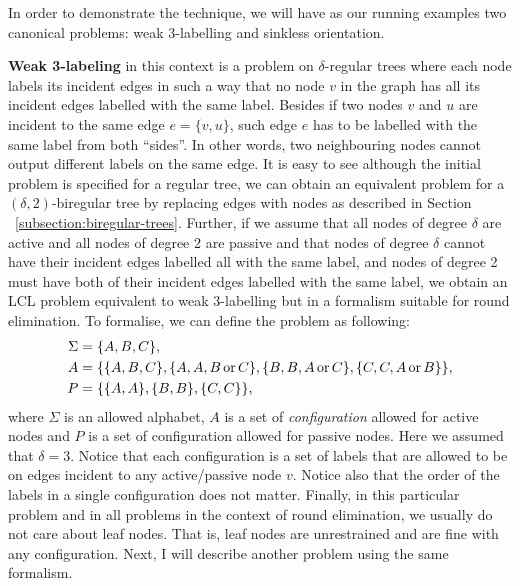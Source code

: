 In order to demonstrate the technique, we will have as our running
examples two canonical problems: weak 3-labelling and sinkless orientation.

\textbf{Weak 3-labeling} in this context is a problem on $\delta$-regular trees where
each node labels its incident edges in such a way that no node $v$ in the graph
has all its incident edges labelled with the same label. Besides if two
nodes $v$ and $u$ are incident to the same edge $e = \{v, u\}$, such
edge $e$ has to be labelled with the same label from both ``sides''. In other words,
two neighbouring nodes cannot output different labels on the same edge.
It is easy to see although the initial problem is specified for a regular
tree, we can obtain an equivalent problem for a $(\delta, 2)$-biregular tree
by replacing edges with nodes as described in Section ~\ref{subsection:biregular-trees}.
Further, if we assume that all nodes of degree $\delta$ are active and all nodes of 
degree 2 are passive and that nodes of degree $\delta$ cannot have their incident
edges labelled all with the same label, and nodes of degree 2 must have both of their
incident edges labelled with the same label, we obtain an LCL problem equivalent to
weak 3-labelling but in a formalism suitable for round elimination. To formalise, we
can define the problem as following:
\begin{align*}
\Sigma &= \{A, B, C\}, \\
A &= \{ \{A, B, C\}, \{A, A, B \operatorname{or} C\}, \{B, B, A \operatorname{or} C\}, \{C, C, A \operatorname{or} B\} \}, \\
P &= \{ \{A, A\}, \{B, B\}, \{C, C\}\},
\end{align*}
where $\Sigma$ is an allowed alphabet, $A$ is a set of \emph{configuration}
allowed for active nodes and $P$ is a set of configuration allowed for
passive nodes. Here we assumed that $\delta = 3$. Notice that each
configuration is a set of labels that are allowed to be on edges 
incident to any active/passive node $v$. Notice also that the order of
the labels in a single configuration does not matter. Finally, in this particular problem
and in all problems in the context of round elimination, we usually do not care about
leaf nodes. That is, leaf nodes are unrestrained and are fine with any 
configuration.  Next, I will
describe another problem using the same formalism.

